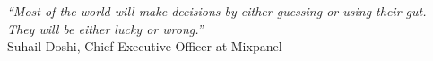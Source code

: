 \cleardoublepage
\thispagestyle{plain}

\vspace*{8cm}

\begin{flushright}
  \textsl{``Most of the world will make decisions by either guessing or using their gut.\\They will be either lucky or wrong.''}\\
\vspace*{1.5cm}
    Suhail Doshi, Chief Executive Officer at Mixpanel
\end{flushright}

